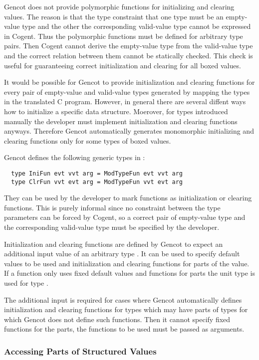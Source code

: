 Gencot does not provide polymorphic functions for initializing and clearing values. The reason is that the type
constraint that one type must be an empty-value type and the other the corresponding valid-value type cannot be
expressed in Cogent. Thus the polymorphic functions must be defined for arbitrary type pairs. Then Cogent cannot 
derive the empty-value type from the valid-value type and the correct relation between them cannot be statically
checked. This check is useful for guaranteeing correct initialization and clearing for all boxed values.

It would be possible for Gencot to provide initialization and clearing functions for every pair of empty-value
and valid-value types generated by mapping the types in the translated C program. However, in general there are 
several diffent ways how to initialize a specific data structure. Moerover, for types introduced manually the developer 
must implement initialization and clearing functions anyways. Therefore Gencot automatically generates
monomorphic initializing and clearing functions only for some types of boxed values.

Gencot defines the following generic types in :
\begin{verbatim}
  type IniFun evt vvt arg = ModTypeFun evt vvt arg
  type ClrFun vvt evt arg = ModTypeFun vvt evt arg
\end{verbatim}
They can be used by the developer to mark functions as initialization or clearing functions. This is purely 
informal since no constraint between the type parameters can be forced by Cogent, so a correct pair of 
empty-value type and the corresponding valid-value type must be specified by the developer.

Initialization and clearing functions are defined by Gencot to expect an additional input value of an
arbitrary type . It can be used to specify default values to be used and initialization and clearing 
functions for parts of the value. If a function only uses fixed default values and functions for parts 
the unit type \code{()} is used for type .

The additional input is required for cases where Gencot automatically defines initialization and clearing
functions for types which may have parts of types for which Gencot does not define such functions. Then 
it cannot specify fixed functions for the parts, the functions to be used must be passed as arguments.

\subsubsection{Accessing Parts of Structured Values}

